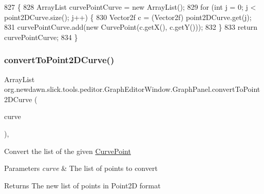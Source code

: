 \begin{DoxyCode}
827                                                                            \{
828             ArrayList curvePointCurve = \textcolor{keyword}{new} ArrayList();
829             \textcolor{keywordflow}{for} (\textcolor{keywordtype}{int} j = 0; j < point2DCurve.size(); j++) \{
830                 Vector2f c = (Vector2f) point2DCurve.get(j);
831                 curvePointCurve.add(\textcolor{keyword}{new} CurvePoint(c.getX(), c.getY()));
832             \}
833             \textcolor{keywordflow}{return} curvePointCurve;
834         \}
\end{DoxyCode}
\mbox{\label{classorg_1_1newdawn_1_1slick_1_1tools_1_1peditor_1_1_graph_editor_window_1_1_graph_panel_a6ed82586e275b0b330d382f80dea4c1f}} 
\subsubsection{\texorpdfstring{convert\+To\+Point2\+D\+Curve()}{convertToPoint2DCurve()}}
{\footnotesize\ttfamily Array\+List org.\+newdawn.\+slick.\+tools.\+peditor.\+Graph\+Editor\+Window.\+Graph\+Panel.\+convert\+To\+Point2\+D\+Curve (\begin{DoxyParamCaption}\item[{Array\+List}]{curve }\end{DoxyParamCaption})\hspace{0.3cm}{\ttfamily [inline]}, {\ttfamily [private]}}

Convert the list of the given \mbox{\hyperlink{classorg_1_1newdawn_1_1slick_1_1tools_1_1peditor_1_1_graph_editor_window_1_1_graph_panel_1_1_curve_point}{Curve\+Point}}


\begin{DoxyParams}{Parameters}
{\em curve} & The list of points to convert \\
\hline
\end{DoxyParams}
\begin{DoxyReturn}{Returns}
The new list of points in Point2D format 
\end{DoxyReturn}

